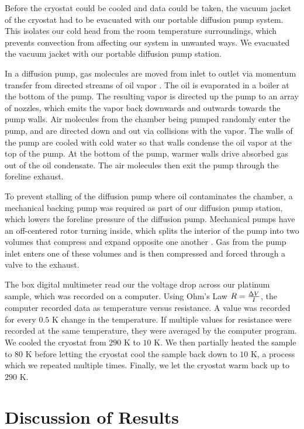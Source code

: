 \documentclass[11pt,letterpaper]{article}
\begin{document}
Before the cryostat could be cooled and data could be taken, the vacuum jacket of the cryostat had to be evacuated with our portable diffusion pump system. This isolates our cold head from the room temperature surroundings, which prevents convection from affecting our system in unwanted ways. We evacuated the vacuum jacket with our portable diffusion pump station.

In a diffusion pump, gas molecules are moved from inlet to outlet via momentum transfer from directed streams of oil vapor \cite{Moore}. The oil is evaporated in a boiler at the bottom of the pump. The resulting vapor is directed up the pump to an array of nozzles, which emits the vapor back downwards and outwards towards the pump walls. Air molecules from the chamber being pumped randomly enter the pump, and are directed down and out via collisions with the vapor. The walls of the pump are cooled with cold water so that walls condense the oil vapor at the top of the pump. At the bottom of the pump, warmer walls drive absorbed gas out of the oil condensate. The air molecules then exit the pump through the foreline exhaust.

To prevent stalling of the diffusion pump where oil contaminates the chamber, a mechanical backing pump was required as part of our diffusion pump station, which lowers the foreline pressure of the diffusion pump. Mechanical pumps have an off-centered rotor turning inside, which splits the interior of the pump into two volumes that compress and expand opposite one another \cite{Moore}. Gas from the pump inlet enters one of these volumes and is then compressed and forced through a valve to the exhaust.

The box digital multimeter read our the voltage drop across our platinum sample, which was recorded on a computer. Using Ohm's Law $R = {\Delta V \over I}$, the computer recorded data as temperature versus resistance. A value was recorded for every $0.5$ K change in the temperature. If multiple values for resistance were recorded at the same temperature, they were averaged by the computer program. We cooled the cryostat from $290$ K to $10$ K. We then partially heated the sample to $80$ K before  letting the cryostat cool the sample back down to $10$ K, a process which we repeated multiple times. Finally, we let the cryostat warm back up to $290$ K.


\section{Discussion of Results}
\end{document}
